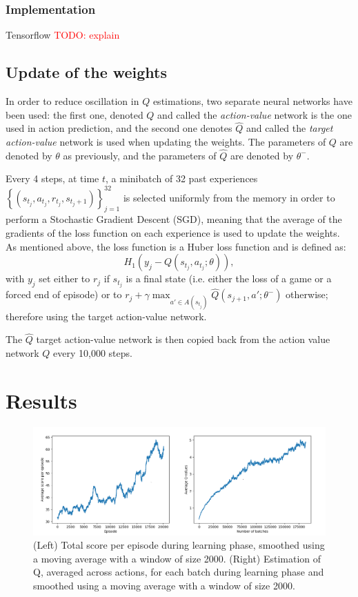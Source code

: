 \documentclass[letterpaper]{article}
\newcommand\todo[1]{\textcolor{red}{TODO: #1}}
\begin{document}
\subsubsection{Implementation}
Tensorflow \todo{explain}
\citep{tensorflow2015-whitepaper}


\subsection{Update of the weights}

In order to reduce oscillation in $Q$ estimations, two separate neural networks have been used: the first one, denoted $Q$ and called the \textit{action-value}
network is the one used in action prediction, and the second one denotes $\hat Q$ and called the \textit{target action-value} network is used when
updating the weights. The parameters of $Q$ are denoted by $\theta$ as previously, and the parameters of $\hat Q$ are denoted by $\theta^-$.

Every 4 steps, at time $t$, a minibatch of 32 past experiences $\left\{(s_{t_j}, a_{t_j}, r_{t_j}, s_{t_j+1})\right\}_{j=1}^{32}$ is selected uniformly from the
memory in order to perform a Stochastic Gradient Descent (SGD), meaning that the average of the gradients of the loss function on each experience is used to update
the weights. As mentioned above, the loss function is a Huber loss function and is defined as:
\begin{equation}
	H_1\left(y_j - Q(s_{t_j}, a_{t_j}; \theta)\right),
\end{equation}
with $y_j$ set either to $r_j$ if $s_{t_j}$ is a final state (i.e. either the loss of a game or a forced end of episode) or to
$r_j + \gamma\max_{a' \in A(s_{t_j})}\hat Q(s_{j+1}, a'; \theta^-)$ otherwise; therefore using the target action-value network.

The $\hat Q$ target action-value network is then copied back from the action value network $Q$ every 10,000 steps.

\section{Results}

\begin{figure}
  \includegraphics[width=\textwidth]{figures/dqn_uniform}
  \caption{(Left) Total score per episode during learning phase, smoothed using a moving average with a window of size 2000.
     (Right) Estimation of Q, averaged across actions, for each batch during learning phase and smoothed using a moving average
      with a window of size 2000.}
\end{figure}
\end{document}
